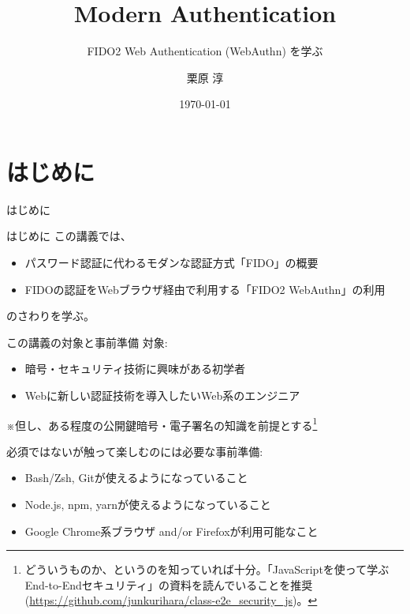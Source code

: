 \documentclass[12pt,dvipdfmx,uplatex]{beamer}
\title[Modern Authentication]{Modern Authentication}
\subtitle{FIDO2 Web Authentication (WebAuthn) を学ぶ}
\author[Jun Kurihara]{栗原 淳}
\institute[U-Hyogo/Zettant]{兵庫県立大学 大学院応用情報科学研究科 \\ 株式会社ゼタント}
\date[\today]{\today}
\begin{document}
\begin{frame}
\titlepage
\end{frame}

\section{はじめに}
\begin{frame}
 \centering
 {\Large はじめに}
\end{frame}

\begin{frame}{はじめに}
この講義では、
\begin{itemize}
 \item パスワード認証に代わるモダンな認証方式「FIDO」の概要
 \item FIDOの認証をWebブラウザ経由で利用する「FIDO2 WebAuthn」の利用
\end{itemize}
のさわりを学ぶ。
\end{frame}

\begin{frame}{この講義の対象と事前準備}
対象:
\begin{itemize}
\item 暗号・セキュリティ技術に興味がある初学者
\item Webに新しい認証技術を導入したいWeb系のエンジニア
\end{itemize}

\vspace{2ex}

※但し、ある程度の公開鍵暗号・電子署名の知識を前提とする\footnote[frame]{\scriptsize どういうものか、というのを知っていれば十分。「JavaScriptを使って学ぶEnd-to-Endセキュリティ」の資料を読んでいることを推奨 (\url{https://github.com/junkurihara/class-e2e_security_js})。}

\vspace{2ex}

必須ではないが触って楽しむのには必要な事前準備:
\begin{itemize}
\item Bash/Zsh, Gitが使えるようになっていること
\item Node.js, npm, yarnが使えるようになっていること
\item Google Chrome系ブラウザ and/or Firefoxが利用可能なこと
\end{itemize}
\end{frame}
\end{document}

